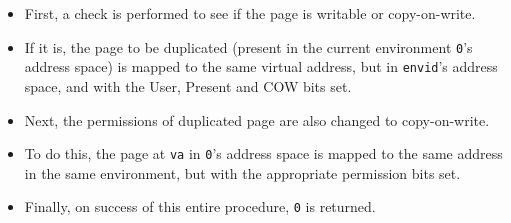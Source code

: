 \documentclass[]{article}
\begin{document}
\begin{enumerate}
  \begin{itemize}
  \itemsep1pt\parskip0pt
  \item
    First, a check is performed to see if the page is writable or
    copy-on-write.
  \item
    If it is, the page to be duplicated (present in the current
    environment \texttt{0}'s address space) is mapped to the same
    virtual address, but in \texttt{envid}'s address space, and with the
    User, Present and COW bits set.
  \item
    Next, the permissions of duplicated page are also changed to
    copy-on-write.
  \item
    To do this, the page at \texttt{va} in \texttt{0}'s address space is
    mapped to the same address in the same environment, but with the
    appropriate permission bits set.
  \item
    Finally, on success of this entire procedure, \texttt{0} is
    returned.
  \end{itemize}
\end{enumerate}
\end{document}
